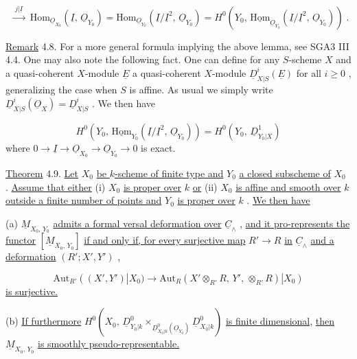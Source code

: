\begin{equation*}
[B] \;\xrightarrow{\;j|\underline{I}\;}\; \mathrm{Hom}_{\underline{O}_{X_0}}(\underline{I},\, \underline{O}_{Y_0}) = \mathrm{Hom}_{\underline{O}_{Y_0}}(\underline{I}/\underline{I}^2,\, \underline{O}_{Y_0}) = H^0(Y_0,\, \underline{\mathrm{Hom}}_{\underline{O}_{Y_0}}(\underline{I}/\underline{I}^2,\, \underline{O}_{Y_0}))\;.
\end{equation*}


\underline{Remark} 4.8.  For a more general formula implying the above lemma, see SGA3 III 4.4. One may also note the following fact. One can define for any $S$-scheme $X$ and a quasi-coherent $X$-module $\underline{E}$ a quasi-coherent $X$-module $\underline{D}^i_{X|S}(\underline{E})$ for all $i \geq 0$ , generalizing the case when $S$ is affine. As usual we simply write $\underline{D}^i_{X|S}(\underline{O}_X) = \underline{D}^i_{X|S}$ . We then have

\begin{equation*}
H^0(Y_0,\, \underline{\mathrm{Hom}}_{Y_0}(\underline{I}/\underline{I}^2,\, \underline{O}_{Y_0})) = H^0(Y_0,\, \underline{D}^1_{Y_0|X})
\end{equation*}
where $0 \to \underline{I} \to \underline{O}_{X_0} \to \underline{O}_{Y_0} \to 0$ is exact.

\underline{Theorem} 4.9.  \underline{Let} $X_0$ \underline{be $k$-scheme of finite type and} $Y_0$ \underline{a closed subscheme of} $X_0$ . \underline{Assume that either} (i) $X_0$ \underline{is proper over} $k$ \underline{or} (ii) $X_0$ \underline{is affine and smooth over} $k$ \underline{outside a finite number of points and} $Y_0$ \underline{is proper over} $k$ . \underline{We then have}

(a) $\underline{M}_{X_0,\,Y_0}$ \underline{admits a formal versal deformation over} $\underline{C}_\wedge$ , \underline{and it pro-represents the functor} $[\underline{M}_{X_0,\,Y_0}]$ \underline{if and only if, for every surjective map} $R' \to R$ \underline{in} $\underline{C}_\wedge$ \underline{and a deformation} $(R'; X', Y')$ ,

\begin{equation*}
\mathrm{Aut}_{R'}((X', Y')|X_0) \to \mathrm{Aut}_R(X' \otimes_{R'} R,\, Y',\, \otimes_{R'} R)|X_0)
\end{equation*}
\underline{is surjective.}

(b) \underline{If furthermore} $H^0(X_0,\, \underline{D}^0_{Y_0|k} \times_{\underline{D}^0_{X_0|k}(\underline{O}_{Y_0})} \underline{D}^0_{X_0|k})$ \underline{is finite dimensional,} \underline{then} $\underline{M}_{X_0,\,Y_0}$ \underline{is smoothly pseudo-representable.}

